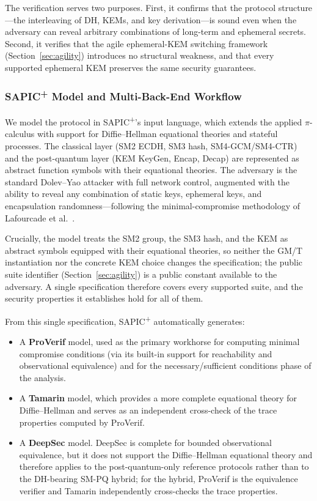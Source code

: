 \documentclass{SCIS2026}
\begin{document}
The verification serves two purposes.  First, it confirms that the
protocol structure---the interleaving of DH, KEMs, and key
derivation---is sound even when the adversary can reveal arbitrary
combinations of long-term and ephemeral secrets.  Second, it verifies
that the agile ephemeral-KEM switching framework
(Section~\ref{sec:agility}) introduces no structural weakness, and that
every supported ephemeral KEM preserves the same security guarantees.

\subsubsection{SAPIC\textsuperscript{+} Model and Multi-Back-End
               Workflow}
\label{sec:sapicmodel}

We model the protocol in SAPIC\textsuperscript{+}'s input language,
which extends the applied $\pi$-calculus with support for
Diffie--Hellman equational theories and stateful processes.  The
classical layer (SM2 ECDH, SM3 hash, SM4-GCM/SM4-CTR) and the
post-quantum layer (KEM KeyGen, Encap, Decap) are represented as
abstract function symbols with their equational theories.  The
adversary is the standard Dolev--Yao attacker with full network
control, augmented with the ability to reveal any combination of
static keys, ephemeral keys, and encapsulation
randomness---following the minimal-compromise methodology of
Lafourcade et al.~\cite{40}.

Crucially, the model treats the SM2 group, the SM3 hash, and the KEM as
abstract symbols equipped with their equational theories, so neither
the GM/T instantiation nor the concrete KEM choice changes the
specification; the public suite identifier
(Section~\ref{sec:agility}) is a public constant available to the
adversary.  A single specification therefore covers every supported
suite, and the security properties it establishes hold for all of them.

From this single specification, SAPIC\textsuperscript{+} automatically
generates:
\begin{itemize}
\item A \textbf{ProVerif} model, used as the primary workhorse for
computing minimal compromise conditions (via its built-in support for
reachability and observational equivalence) and for the
necessary/sufficient conditions phase of the analysis.
\item A \textbf{Tamarin} model, which provides a more complete
equational theory for Diffie--Hellman and serves as an independent
cross-check of the trace properties computed by ProVerif.
\item A \textbf{DeepSec} model.  DeepSec is complete for bounded
observational equivalence, but it does not support the Diffie--Hellman
equational theory and therefore applies to the post-quantum-only
reference protocols rather than to the DH-bearing SM-PQ hybrid; for the
hybrid, ProVerif is the equivalence verifier and Tamarin independently
cross-checks the trace properties.
\end{itemize}
\end{document}
